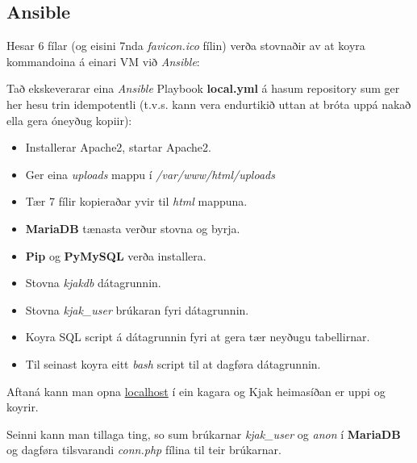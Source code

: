 \documentclass{article}
\begin{document}
\subsection{Ansible}
\par Hesar 6 fílar (og eisini 7nda \textit{favicon.ico} fílin) verða stovnaðir
av at koyra kommandoina á einari VM við \textit{Ansible}:
\newline
\newline
{}
\newline
\par Tað ekskeverarar eina \textit{Ansible} Playbook \textbf{local.yml} á hasum
repository sum ger her hesu trin idempotentli (t.v.s. kann vera endurtikið uttan at
bróta uppá nakað ella gera óneyðug kopiir):
\begin{itemize}
    \item Installerar Apache2, startar Apache2.
    \item Ger eina \textit{uploads} mappu í \textit{/var/www/html/uploads}
    \item Tær 7 fílir kopieraðar yvir til \textit{html} mappuna.
    \item \textbf{MariaDB} tænasta verður stovna og byrja.
    \item \textbf{Pip} og \textbf{PyMySQL} verða installera.
    \item Stovna \textit{kjakdb} dátagrunnin.
    \item Stovna \textit{kjak\_user} brúkaran fyri dátagrunnin.
    \item Koyra SQL script á dátagrunnin fyri at gera tær neyðugu tabellirnar.
    \item Til seinast koyra eitt \textit{bash} script til at dagføra dátagrunnin.
\end{itemize}

 Aftaná kann man opna \underline{localhost} í ein kagara og Kjak heimasíðan er uppi
 og koyrir.

 \par Seinni kann man tillaga ting, so sum brúkarnar \textit{kjak\_user} og \textit{anon}
í \textbf{MariaDB} og dagføra tilsvarandi \textit{conn.php} fílina til teir brúkarnar.
\end{document}
